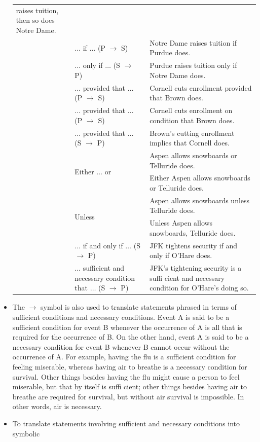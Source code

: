 \documentclass[a4paper,oneside]{book}
\begin{document}
\begin{itemize}
\begin{tabular}[H]{|>{\centering\arraybackslash}p{1.5cm}p{4.5cm}p{10cm}|}
  raises tuition, then so does Notre Dame.\\
  & $\ldots$ if $\ldots$ (P $\to$ S) & Notre Dame raises tuition if Purdue
  does.\\
  & $\ldots$ only if $\ldots$ (S $\to$ P) & Purdue raises tuition only if Notre
  Dame does.\\
  & $\ldots$ provided that $\ldots$ (P $\to$ S) & Cornell cuts enrollment
  provided that Brown does.\\
   & $\ldots$ provided that $\ldots$ (P $\to$ S) & Cornell cuts enrollment on
   condition that Brown does.\\
   & $\ldots$ provided that $\ldots$ (S $\to$ P) & Brown’s cutting enrollment
   implies that Cornell does.\\ \hline
  \multirow{4}{*}{$\lor$} & \multirow{2}{*}{Either $\ldots$ or} & Aspen allows
  snowboards or Telluride does.\\
  & & Either Aspen allows snowboards or Telluride does.\\
  & \multirow{2}{*}{Unless} & Aspen allows snowboards unless Telluride does.\\
  & & Unless Aspen allows snowboards, Telluride does.\\ \hline
  \multirow{2}{*}{$\leftrightarrow$} & $\ldots$ if and only if $\ldots$ (S
  $\to$ P) & JFK tightens security if and only if O’Hare does.\\
   & $\ldots$ sufficient and necessary condition that $\ldots$ (S $\to$ P) & JFK’s tightening security is a suffi cient and
necessary condition for O’Hare’s doing so.\\   \hline
  \end{tabular}
  \item The $\to$ symbol is also used to translate statements phrased in terms
  of sufficient conditions and necessary conditions. Event A is said to be a sufficient condition
for event B whenever the occurrence of A is all that is required for the occurrence of B.
On the other hand, event A is said to be a necessary condition for event B whenever
B cannot occur without the occurrence of A. For example, having the flu is a sufficient
condition for feeling miserable, whereas having air to breathe is a necessary condition
for survival. Other things besides having the flu might cause a person to feel miserable,
but that by itself is suffi cient; other things besides having air to breathe are required for
survival, but without air survival is impossible. In other words, air is
necessary.
\item To translate statements involving sufficient and necessary conditions into symbolic

\end{itemize}
\end{document}
